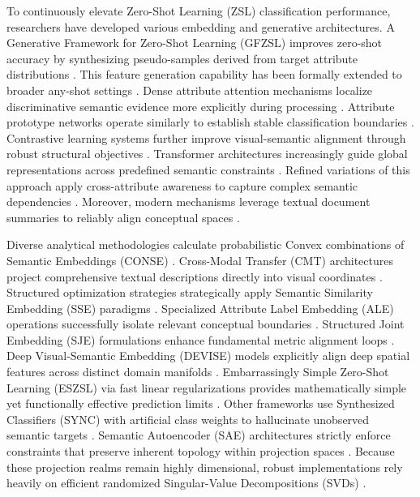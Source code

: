 \documentclass[make,article,submit,pdftex,moreauthors]{Definitions/mdpi}
\begin{document}
To continuously elevate Zero-Shot Learning (ZSL) classification performance, researchers have developed various embedding and generative architectures. A Generative Framework for Zero-Shot Learning (GFZSL) improves zero-shot accuracy by synthesizing pseudo-samples derived from target attribute distributions \cite{Verma2017GFZSL}. This feature generation capability has been formally extended to broader any-shot settings \cite{Xian2019Fvaegan}. Dense attribute attention mechanisms localize discriminative semantic evidence more explicitly during processing \cite{Huynh2020DAZLE}. Attribute prototype networks operate similarly to establish stable classification boundaries \cite{Xu2020APN}. Contrastive learning systems further improve visual-semantic alignment through robust structural objectives \cite{Han2021CEGZSL}. Transformer architectures increasingly guide global representations across predefined semantic constraints \cite{Chen2022TransZero}. Refined variations of this approach apply cross-attribute awareness to capture complex semantic dependencies \cite{Chen2023TransZeroPlus}. Moreover, modern mechanisms leverage textual document summaries to reliably align conceptual spaces \cite{Naeem2024I2DFormer}.

Diverse analytical methodologies calculate probabilistic Convex combinations of Semantic Embeddings (CONSE) \cite{Norouzi2014ConSE}. Cross-Modal Transfer (CMT) architectures project comprehensive textual descriptions directly into visual coordinates \cite{Socher2013CMT}. Structured optimization strategies strategically apply Semantic Similarity Embedding (SSE) paradigms \cite{Zhang2015SSE}. Specialized Attribute Label Embedding (ALE) operations successfully isolate relevant conceptual boundaries \cite{Akata2016ALE}. Structured Joint Embedding (SJE) formulations enhance fundamental metric alignment loops \cite{Akata2015SJE}. Deep Visual-Semantic Embedding (DEVISE) models explicitly align deep spatial features across distinct domain manifolds \cite{Frome2013DeViSE}. Embarrassingly Simple Zero-Shot Learning (ESZSL) via fast linear regularizations provides mathematically simple yet functionally effective prediction limits \cite{RomeraParedes2015ESZSL}. Other frameworks use Synthesized Classifiers (SYNC) with artificial class weights to hallucinate unobserved semantic targets \cite{Changpinyo2016SYNC}. Semantic Autoencoder (SAE) architectures strictly enforce constraints that preserve inherent topology within projection spaces \cite{Kodirov2017SAE}. Because these projection realms remain highly dimensional, robust implementations rely heavily on efficient randomized Singular-Value Decompositions (SVDs) \cite{Halko2011RandomizedSVD}. 
\end{document}
